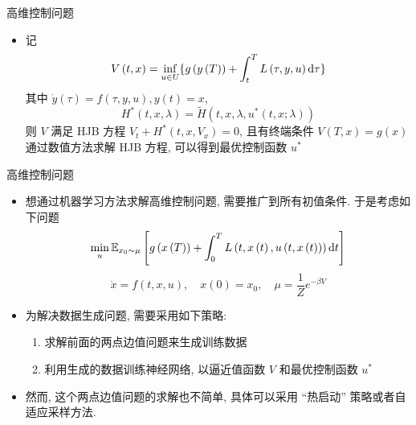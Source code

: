 \documentclass[aspectratio=169]{beamer}
\def\dif{\mathinner{\mathrm{d}}\hphantom{\mskip-\thinmuskip}}
\begin{document}
	\begin{frame}{高维控制问题}
		\begin{itemize}
			\item 记
				\begin{equation*}
					V\left(t, x\right) = \inf_{u \in U}\{g\left(y\left(T\right)\right) + \int_{t}^{T}L\left(\tau, y, u\right) \dif \tau\}
				\end{equation*}
				其中 $\dot{y}\left(\tau\right) = f\left(\tau, y, u\right), y\left(t\right) = x$,
				\begin{equation*}
					H^{*}\left(t, x, \lambda\right) = \tilde{H}\left(t, x, \lambda, u^{*}\left(t, x; \lambda\right)\right)
				\end{equation*}
				则 $V$ 满足 HJB 方程 $V_{t} + H^{*}\left(t, x, V_{x}\right) = 0$, 且有终端条件 $V\left(T, x\right) = g\left(x\right)$ 通过数值方法求解 HJB 方程, 可以得到最优控制函数 $u^{*}$
		\end{itemize}
	\end{frame}

	\begin{frame}{高维控制问题}
		\begin{itemize}
			\item 想通过机器学习方法求解高维控制问题, 需要推广到所有初值条件. 于是考虑如下问题
				\begin{equation*}
					\min_{u} \mathbb{E}_{x_{0}\sim\mu}\left[g\left(x\left(T\right)\right) + \int_{0}^{T} L\left(t, x\left(t\right), u\left(t, x\left(t\right)\right)\right) \dif t \right]
				\end{equation*}
				\begin{equation*}
					\dot{x} = f\left(t, x, u\right),\quad x\left(0\right) = x_{0},\quad \mu = \frac{1}{Z}e^{-\beta V}
				\end{equation*}
			\item 为解决数据生成问题, 需要采用如下策略:
				\begin{enumerate}
					\item 求解前面的两点边值问题来生成训练数据
					\item 利用生成的数据训练神经网络, 以逼近值函数 $V$ 和最优控制函数 $u^{*}$
				\end{enumerate}
			\item 然而, 这个两点边值问题的求解也不简单, 具体可以采用 ``热启动'' 策略或者自适应采样方法.
		\end{itemize}
	\end{frame}
\end{document}
